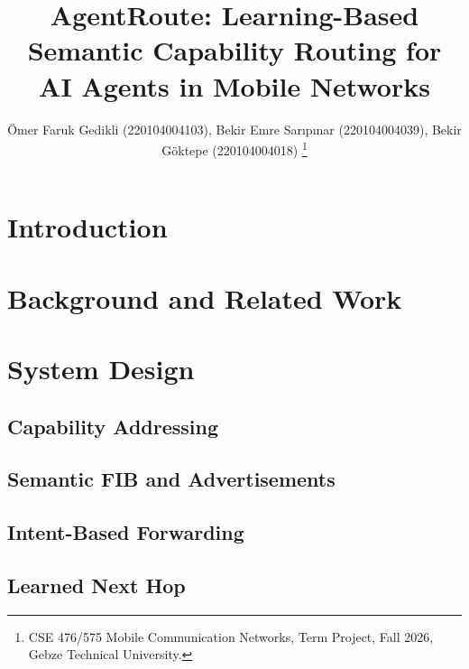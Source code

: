 \documentclass[journal]{IEEEtran}
\begin{document}
\title{AgentRoute: Learning-Based Semantic Capability Routing for AI Agents in Mobile Networks}

\author{\"Omer Faruk Gedikli (220104004103), Bekir Emre Sar{\i}p{\i}nar (220104004039), Bekir G\"oktepe (220104004018)%
\thanks{CSE 476/575 Mobile Communication Networks, Term Project, Fall 2026, Gebze Technical University.}}

\maketitle

\begin{abstract}
\end{abstract}

\begin{IEEEkeywords}
\end{IEEEkeywords}

\section{Introduction}

\section{Background and Related Work}

\section{System Design}

\subsection{Capability Addressing}

\subsection{Semantic FIB and Advertisements}

\subsection{Intent-Based Forwarding}

\subsection{Learned Next Hop}
\end{document}
